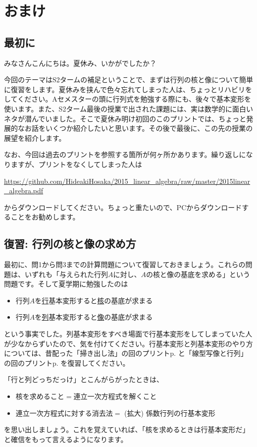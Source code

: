 \chapter{おまけ}

\section{最初に}
みなさんこんにちは。夏休み、いかがでしたか？

今回のテーマはS2タームの補足ということで、まずは行列の核と像について簡単に復習をします。夏休みを挟んで色々忘れてしまった人は、ちょっとリハビリをしてください。Aセメスターの頭に行列式を勉強する際にも、後々で基本変形を使います。また、S2ターム最後の授業で出された課題には、実は数学的に面白いネタが潜んでいました。そこで夏休み明け初回のこのプリントでは、ちょっと発展的なお話をいくつか紹介したいと思います。その後で最後に、この先の授業の展望を紹介します。

なお、今回は過去のプリントを参照する箇所が何ヶ所かあります。繰り返しになりますが、プリントをなくしてしまった人は
\begin{center}
\url{https://github.com/HideakiHosaka/2015_linear_algebra/raw/master/2015linear_algebra.pdf}
\end{center}
からダウンロードしてください。ちょっと重たいので、PCからダウンロードすることをお勧めします。


\section{復習: 行列の核と像の求め方}

最初に、問1から問3までの計算問題について復習しておきましょう。これらの問題は、いずれも「与えられた行列$A$に対し、$A$の核と像の基底を求める」という問題です。そして夏学期に勉強したのは
\begin{itemize}
\item 行列$A$を\uline{行}基本変形すると\uline{核}の基底が求まる
\item 行列$A$を\uline{列}基本変形すると\uline{像}の基底が求まる
\end{itemize}
という事実でした。列基本変形をすべき場面で行基本変形をしてしまっていた人が少なからずいたので、気を付けてください。行基本変形と列基本変形のやり方については、昔配った「掃き出し法」の回のプリントp. \pageref{section:swipe}と「線型写像と行列」の回のプリントp. \pageref{subsection:column_elementary_operation}を復習してください。

「行と列どっちだっけ」とこんがらがったときは、
\begin{itemize}
\item 核を求めること$=$連立一次方程式を解くこと
\item 連立一次方程式に対する消去法$=$ (拡大) 係数行列の行基本変形
\end{itemize}
を思い出しましょう。これを覚えていれば、「核を求めるときは行基本変形だ」と確信をもって言えるようになります。

